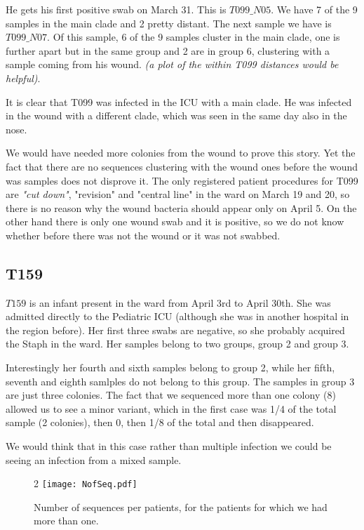 \documentclass[12pt,a4paper]{article}
\begin{document}
He gets his first positive swab on March 31. This is $T099\_N05$. We have 7 of the 9 samples in the main clade and 2 pretty distant. The next sample we have is $T099\_N07$.
Of this sample, 6 of the 9 samples cluster in the main clade, one is further apart but in the same group and 2 are in group 6, clustering with a sample coming from his wound. \textit{(a plot of the within T099 distances would be helpful)}. 

It is clear that T099 was infected in the ICU with a main clade. He was infected in the wound with a different clade, which was seen in the same day also in the nose. 

We would have needed more colonies from the wound to prove this story. Yet the fact that there are no sequences clustering with the wound ones before the wound was samples does not disprove it. The only registered patient procedures for T099 are \textit{"cut down"}, "revision" and "central line" in the ward on March 19 and 20, so there is no reason why the wound bacteria should appear only on April 5. On the other hand there is only one wound swab and it is positive, so we do not know whether before there was not the wound or it was not swabbed.

\subsection{T159}
$T159$ is an infant present in the ward from April 3rd to April 30th. She was admitted directly to the Pediatric ICU (although she was in another hospital in the region before). Her first three swabs are negative, so she probably acquired the Staph in the ward. Her samples belong to two groups, group 2 and group 3.

Interestingly her fourth and sixth samples belong to group 2, while her fifth, seventh and eighth samlples do not belong to this group.
The samples in group 3 are just three colonies. The fact that we sequenced more than one colony (8) allowed us to see a minor variant, which in the first case was 1/4 of the total sample (2 colonies), then 0, then 1/8 of the total and then disappeared.

We would think that in this case rather than multiple infection we could be seeing an infection from a mixed sample. 


\begin{figure}[!ht]
  \centering
    
2      \texttt{[image: NofSeq.pdf]}
  \caption{Number of sequences per patients, for the patients for which we had more than one.}\label{Nseq}
\end{figure}
\end{document}
